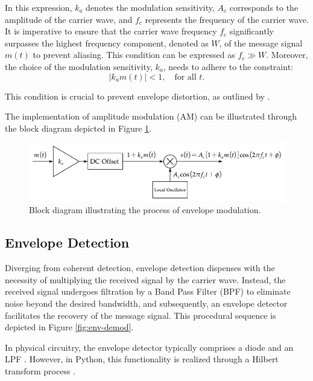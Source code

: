 \documentclass[../ECE459FinalProjectReport.tex]{subfiles}
\begin{document}
In this expression, $k_a$ denotes the modulation sensitivity, $A_c$ corresponds to the amplitude of the carrier wave, and $f_c$ represents the frequency of the carrier wave. It is imperative to ensure that the carrier wave frequency $f_c$ significantly surpasses the highest frequency component, denoted as $W$, of the message signal $m(t)$ to prevent aliasing. This condition can be expressed as $f_c \gg W$. Moreover, the choice of the modulation sensitivity, $k_a$, needs to adhere to the constraint:
\begin{equation}
    \left| k_a m(t) \right| < 1, \quad \text{for all }t.
\end{equation}

This condition is crucial to prevent envelope distortion, as outlined by \textcite[pp. 101-102]{haykinIntroductionAnalogDigital2007}.

The implementation of amplitude modulation (AM) can be illustrated through the block diagram depicted in Figure \ref{fig:env-mod}.
\begin{figure}[b]
    \centering
    \includegraphics[scale=0.7]{plots/env_mod.pdf}
    \caption{Block diagram illustrating the process of envelope modulation.}
    \label{fig:env-mod}
\end{figure}

\subsection{Envelope Detection}
Diverging from coherent detection, envelope detection dispenses with the necessity of multiplying the received signal by the carrier wave. Instead, the received signal undergoes filtration by a Band Pass Filter (BPF) to eliminate noise beyond the desired bandwidth, and subsequently, an envelope detector facilitates the recovery of the message signal. This procedural sequence is depicted in Figure \ref{fig:env-demod}.

In physical circuitry, the envelope detector typically comprises a diode and an LPF \cite{AnalogCommunicationAM}. However, in Python, this functionality is realized through a Hilbert transform process \cite{ulrichEnvelopeCalculationHilbert2006, XiXiaoShengPythonTiQuXinHaoDeBaoLuoGet2023}.
\end{document}

